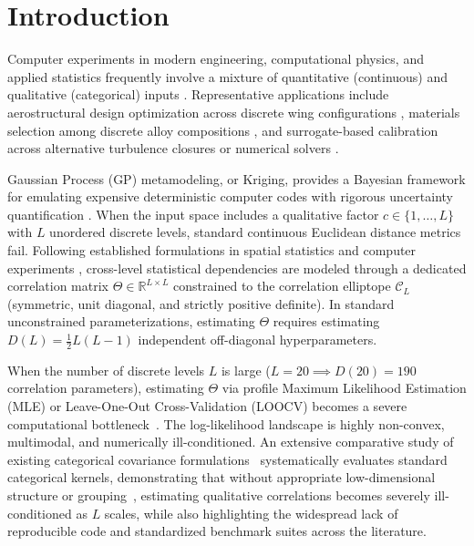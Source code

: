 \documentclass[default,sn-mathphys,Numbered]{sn-jnl}
\theoremstyle{thmstyleone}
\theoremstyle{thmstylethree}
\theoremstyle{thmstyletwo}
\begin{document}
\section{Introduction}
\label{sec:intro}

Computer experiments in modern engineering, computational physics, and applied statistics frequently involve a mixture of quantitative (continuous) and qualitative (categorical) inputs \citep{PDUDE,Deng,Zhou,zhang2020latent,DACE_hier,Roustant,Pelamatti,cuesta2021comparison,CAT-EGO,carpintero2025reproducible}. Representative applications include aerostructural design optimization across discrete wing configurations \citep{saves2023high}, materials selection among discrete alloy compositions \citep{audet2022general,Mixed_Abramson,AuHa2017}, and surrogate-based calibration across alternative turbulence closures or numerical solvers \citep{Pelamatti2020,Gower}.

Gaussian Process (GP) metamodeling, or Kriging, provides a Bayesian framework for emulating expensive deterministic computer codes with rigorous uncertainty quantification \citep{DACE,williams2006gaussian,Kennedy_Bayes,Jones98}. When the input space includes a qualitative factor $c \in \{1, \ldots, L\}$ with $L$ unordered discrete levels, standard continuous Euclidean distance metrics fail. Following established formulations in spatial statistics and computer experiments \citep{Mixed_Paul,PDUDE,Deng,Zhou,zhang2020latent,Roustant,Pelamatti}, cross-level statistical dependencies are modeled through a dedicated correlation matrix $\Theta \in \mathbb{R}^{L \times L}$ constrained to the correlation elliptope $\mathcal{C}_L$ (symmetric, unit diagonal, and strictly positive definite). In standard unconstrained parameterizations, estimating $\Theta$ requires estimating $D(L) = \frac{1}{2}L(L-1)$ independent off-diagonal hyperparameters.

When the number of discrete levels $L$ is large ($L = 20 \implies D(20) = 190$ correlation parameters), estimating $\Theta$ via profile Maximum Likelihood Estimation (MLE) or Leave-One-Out Cross-Validation (LOOCV) becomes a severe computational bottleneck~\citep{appriou2024high}. The log-likelihood landscape is highly non-convex, multimodal, and numerically ill-conditioned. An extensive comparative study of existing categorical covariance formulations~\citep{carpintero2025reproducible} systematically evaluates standard categorical kernels, demonstrating that without appropriate low-dimensional structure or grouping~\citep{Roustant}, estimating qualitative correlations becomes severely ill-conditioned as $L$ scales, while also highlighting the widespread lack of reproducible code and standardized benchmark suites across the literature.
\end{document}
